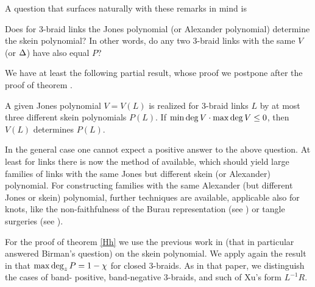 A question that surfaces naturally with these remarks in mind is 

\begin{question}
Does for 3-braid links the Jones polynomial (or Alexander polynomial)
determine the skein polynomial? In other words, do any two
3-braid links with the same $V$ (or $\Delta$) have also equal $P$?
\end{question}

We have at least the following partial result, whose proof we
postpone after the proof of theorem .

\begin{corr}\label{CVP}
A given Jones polynomial $V=V(L)$ is realized for 3-braid links
$L$ by at most three different skein polynomials $P(L)$. If
$\min\deg V\cdot \max\deg V\le 0$, then $V(L)$ determines $P(L)$.
\end{corr}

In the general case one cannot expect a positive answer to the
above question. At least for links there is now the method
of \cite{EKT} available, which should yield large families of
links with the same Jones but different skein (or Alexander)
polynomial. For constructing families with the same Alexander
(but different Jones or skein) polynomial, further techniques
are available, applicable also for knots, like the non-faithfulness
of the Burau representation (see \cite{Bigelow}) or tangle surgeries
(see \cite{Bleiler}).

% 
% 

For the proof of theorem \ref{Hh} we use the previous work in
\cite{3br} (that in
particular answered Birman's question) on the skein polynomial. We
apply again the result in \cite{3br} that $\max\deg_zP=1-\chi$ for closed
3-braids. As in that paper, we distinguish the cases of band-%
positive, band-negative 3-braids, and such of Xu's form $L^{-1}R$. 

